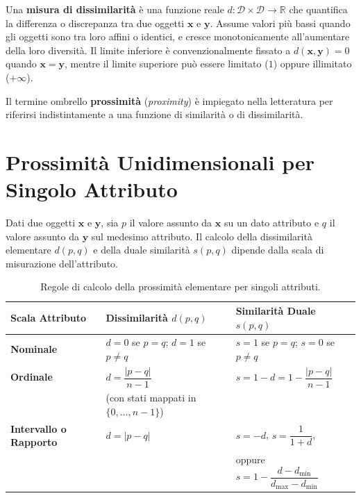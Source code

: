\begin{definition}
Una \textbf{misura di dissimilarità} è una funzione reale $d: \mathcal{D} \times \mathcal{D} \to \mathbb{R}$ che quantifica la differenza o discrepanza tra due oggetti $\mathbf{x}$ e $\mathbf{y}$. Assume valori più bassi quando gli oggetti sono tra loro affini o identici, e cresce monotonicamente all'aumentare della loro diversità. Il limite inferiore è convenzionalmente fissato a $d(\mathbf{x}, \mathbf{y}) = 0$ quando $\mathbf{x} = \mathbf{y}$, mentre il limite superiore può essere limitato ($1$) oppure illimitato ($+\infty$).
\end{definition}

Il termine ombrello \textbf{prossimità} (\textit{proximity}) è impiegato nella letteratura per riferirsi indistintamente a una funzione di similarità o di dissimilarità.

\section{Prossimità Unidimensionali per Singolo Attributo}
\label{sec:dm-single-attribute-proximity}

Dati due oggetti $\mathbf{x}$ e $\mathbf{y}$, sia $p$ il valore assunto da $\mathbf{x}$ su un dato attributo e $q$ il valore assunto da $\mathbf{y}$ sul medesimo attributo. Il calcolo della dissimilarità elementare $d(p, q)$ e della duale similarità $s(p, q)$ dipende dalla scala di misurazione dell'attributo.

\begin{table}[htbp]
\centering
\small
\begin{tabularx}{\textwidth}{lYY}
\toprule
\textbf{Scala Attributo} & \textbf{Dissimilarità $d(p, q)$} & \textbf{Similarità Duale $s(p, q)$} \\
\midrule
\textbf{Nominale} & $d = 0$ se $p = q$; \quad $d = 1$ se $p \neq q$ & $s = 1$ se $p = q$; \quad $s = 0$ se $p \neq q$ \\
\addlinespace
\textbf{Ordinale} & $d = \dfrac{|p - q|}{n - 1}$ & $s = 1 - d = 1 - \dfrac{|p - q|}{n - 1}$ \\
& {\scriptsize (con stati mappati in $\{0, \dots, n-1\}$)} & \\
\addlinespace
\textbf{Intervallo o Rapporto} & $d = |p - q|$ & $s = -d$, \quad $s = \dfrac{1}{1 + d}$, \\
& & oppure $s = 1 - \dfrac{d - d_{\min}}{d_{\max} - d_{\min}}$ \\
\bottomrule
\end{tabularx}
\caption{Regole di calcolo della prossimità elementare per singoli attributi.}
\label{tab:dm-single-attribute-proximity}
\end{table}

